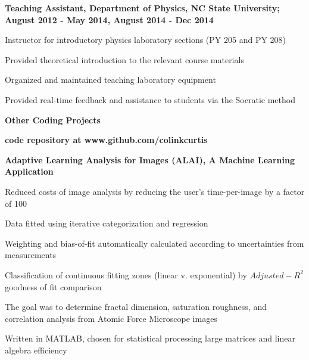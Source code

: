 \documentclass[letterpaper,final]{memoir}
\newcommand{\LargeSep}{\vspace{1.3em}}
\newcommand{\Sep}{\vspace{1.0em}}
\newcommand{\SmallSep}{\vspace{0.4em}}
\newcommand{\CVSection}[1]
	{\LARGE\textbf{#1}\par
	\SmallSep\normalsize}
\newcommand{\CVItem}[1]
	{\textbf{\color{Blue} #1}}
\begin{document}
\Sep

\CVItem{Teaching Assistant, Department of Physics, NC State University; August 2012 - May 2014, August 2014 - Dec 2014}
\begin{compactitem}[\color{Blue}$\circ$]

    \SmallSep
	
    \item Instructor for introductory physics laboratory sections (PY 205 and PY 208)
    \item Provided theoretical introduction to the relevant course materials
    \item Organized and maintained teaching laboratory equipment
    \item Provided real-time feedback and assistance to students via the Socratic method
\end{compactitem}

\LargeSep


\newpage

\notoserif \CVSection{Other Coding Projects}

\normalfont

\Sep

\CVItem{code repository at www.github.com/colinkcurtis} 

\Sep

\CVItem{Adaptive Learning Analysis for Images (ALAI), A Machine Learning Application} 

\begin{compactitem}[\color{Blue}$\circ$]
   
    \SmallSep

    \item Reduced costs of image analysis by reducing the user's time-per-image by a factor of 100

    \item Data fitted using iterative categorization and regression

    \item Weighting and bias-of-fit automatically calculated according to uncertainties from measurements

    \item Classification of continuous fitting zones (linear v. exponential) by $Adjusted-R^2$ goodness of fit comparison

    \item The goal was to determine fractal dimension, saturation roughness, and correlation analysis from Atomic Force Microscope images

    \item Written in MATLAB, chosen for statistical processing large matrices and linear algebra efficiency
    \Sep

\end{compactitem}
\end{document}
